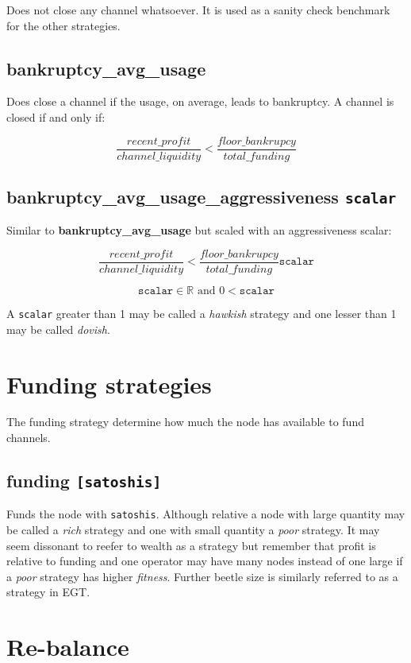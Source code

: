 Does not close any channel whatsoever. It is used as a sanity check benchmark for the other strategies.

\subsection*{bankruptcy\_avg\_usage}

Does close a channel if the usage, on average, leads to bankruptcy. A channel is closed if and only if:

\[ \frac{recent\_profit}{channel\_liquidity} < \frac{floor\_bankrupcy}{total\_funding} \]
 
\subsection*{bankruptcy\_avg\_usage\_aggressiveness \texttt{scalar}}

Similar to \textbf{bankruptcy\_avg\_usage} but scaled with an aggressiveness scalar:

\[ \frac{recent\_profit}{channel\_liquidity} < \frac{floor\_bankrupcy}{total\_funding} \texttt{scalar} \]

\[ \texttt{scalar} \in \mathbb{R} \text{ and } 0 < \texttt{scalar}  \]

A \texttt{scalar} greater than 1 may be called a \textit{hawkish} strategy and one lesser than 1 may be called \textit{dovish}.

\section*{Funding strategies}

The funding strategy determine how much the node has available to fund channels.

\subsection*{funding \texttt{[satoshis]}}

Funds the node with \texttt{satoshis}. Although relative a node with large quantity may be called a \textit{rich} strategy and
one with small quantity a \textit{poor} strategy. It may seem dissonant to reefer to wealth as a strategy but remember 
that profit is relative to funding and one operator may have many nodes instead of one large if a \textit{poor} strategy
has higher \textit{fitness}. Further beetle size is similarly referred to as a strategy in EGT.


\section*{Re-balance}

